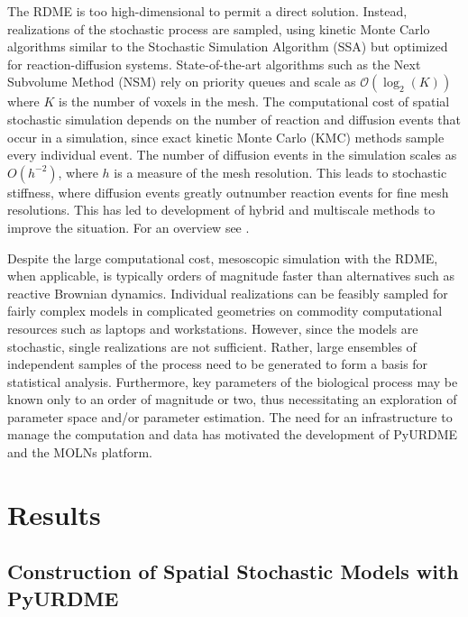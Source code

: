 \documentclass[final,leqno,onefignum,onetabnum]{siamltex1213}
\begin{document}
The RDME is too high-dimensional to permit a direct solution. Instead, realizations of the stochastic process are sampled, using kinetic Monte Carlo algorithms similar to the Stochastic Simulation Algorithm (SSA)\cite{SSA} but optimized for reaction-diffusion systems. State-of-the-art algorithms such as the Next Subvolume Method (NSM)\cite{NSM} rely on priority queues and scale as $\mathcal{O}(\log_2(K))$ where $K$ is the number of voxels in the mesh. The computational cost of spatial stochastic simulation depends on the number of reaction and diffusion events that occur in a simulation, since exact kinetic Monte Carlo (KMC) methods sample every individual event. The number of diffusion events in the simulation scales as $O(h^{-2})$, where $h$ is a measure of the mesh resolution. This leads to stochastic stiffness, where diffusion events greatly outnumber reaction events for fine mesh resolutions. This has led to development of hybrid and multiscale methods to improve the situation. For an overview see \cite{GillHellPetz}. 

Despite the large computational cost, mesoscopic simulation with the RDME, when applicable, is typically orders of magnitude faster than alternatives such as reactive Brownian dynamics.  Individual realizations can be feasibly sampled for fairly complex models in complicated geometries on commodity computational resources such as laptops and workstations. However, since the models are stochastic, single realizations are not sufficient. Rather,  large ensembles of independent samples of the process need to be generated to form a basis for statistical analysis. 
Furthermore, key parameters of the biological process may be known only to an order of magnitude or two, thus necessitating an exploration of parameter space and/or parameter estimation. The need for an infrastructure to manage the computation and data has motivated the development of PyURDME and the MOLNs platform.






\section{Results}
\subsection{Construction of Spatial Stochastic Models with PyURDME}

\label{sec:pyurdme}
\end{document}
